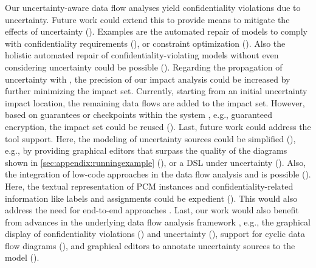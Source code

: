 Our uncertainty-aware data flow analyses yield confidentiality violations due to uncertainty.
Future work could extend this to provide means to mitigate the effects of uncertainty ().
Examples are the automated repair of models to comply with confidentiality requirements (), or constraint optimization ().
Also the holistic automated repair of confidentiality-violating models without even considering uncertainty could be possible ().
Regarding the propagation of uncertainty with \uia, the precision of our impact analysis could be increased by further minimizing the impact set.
Currently, starting from an initial uncertainty impact location, the remaining data flows are added to the impact set.
However, based on guarantees or checkpoints within the system \cite{camara_software_2020}, e.g., guaranteed encryption, the impact set could be reused ().
Last, future work could address the \abunai tool support.
Here, the modeling of uncertainty sources could be simplified (), e.g., by providing graphical editors that surpass the quality of the diagrams shown in \autoref{sec:appendix:runningexample} (), or a \acf{DSL} under uncertainty ().
Also, the integration of low-code approaches in the data flow analysis and \abunai is possible ().
Here, the textual representation of \acf{PCM} instances and confidentiality-related information like labels and assignments could be expedient ().
This would also address the need for end-to-end approaches \cite{weyns_towards_2023}.
Last, our work would also benefit from advances in the underlying data flow analysis framework \cite{boltz_extensible_2024,huller_towards_2024, niehues_integrating_2024}, e.g., the graphical display of confidentiality violations () and uncertainty (), support for cyclic data flow diagrams \cite{arp_analyzing_2024} (), and graphical editors to annotate uncertainty sources to the model ().


